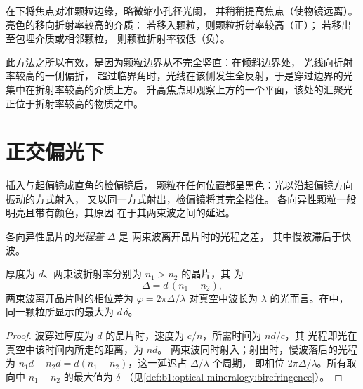 \begin{method}[贝克线检验法]\label{met:b1:optical-mineralogy:becke}
在下将焦点对准颗粒边缘，略微缩小孔径光阑，
并稍稍提高焦点（使物镜远离）。
亮色的移向折射率较高的介质：
若移入颗粒，则颗粒折射率较高（正）；
若移出至包埋介质或相邻颗粒，
则颗粒折射率较低（负）。
\end{method}

此方法之所以有效，是因为颗粒边界从不完全竖直：在倾斜边界处，
光线向折射率较高的一侧偏折，
超过临界角时，光线在该侧发生全反射，于是穿过边界的光
集中在折射率较高的介质上方。
升高焦点即观察上方的一个平面，该处的汇聚光
正位于折射率较高的物质之中。

\section{正交偏光下}

插入与起偏镜成直角的检偏镜后，
颗粒在任何位置都呈黑色：光以沿起偏镜方向振动的方式射入，
又以同一方式射出，检偏镜将其完全挡住。
各向异性颗粒一般明亮且带有颜色，其原因
在于其两束波之间的延迟。

\begin{definition}\label{def:b1:optical-mineralogy:retardation}
各向异性晶片的\emph{光程差} $\Delta$ 是
两束波离开晶片时的光程之差，
其中慢波滞后于快波。
\end{definition}

\begin{proposition}[光程差与双折射率]\label{prop:b1:optical-mineralogy:retardation}
厚度为 $d$、两束波折射率分别为 $n_1 > n_2$ 的晶片，其
为
\[
  \Delta = d\,(n_1 - n_2),
\]
两束波离开晶片时的相位差为 $\varphi = 2\pi\Delta/\lambda$
对真空中波长为 $\lambda$ 的光而言。在中，
同一颗粒所显示的最大为 $d\,\delta$。
\end{proposition}

\begin{proof}
波穿过厚度为 $d$ 的晶片时，速度为 $c/n$，所需时间为 $nd/c$，其
光程即光在真空中该时间内所走的距离，为 $nd$。
两束波同时射入；射出时，慢波落后的光程为
$n_1 d - n_2 d = d(n_1 - n_2)$，这一延迟占 $\Delta/\lambda$ 个周期，
即相位 $2\pi\Delta/\lambda$。所有取向中
$n_1 - n_2$ 的最大值为 $\delta$
（见\cref{def:b1:optical-mineralogy:birefringence}）。
\end{proof}

